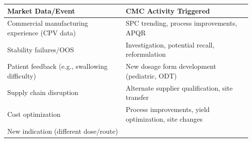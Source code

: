 \documentclass[
  11pt,
  a4paper,
]{report}
\begin{document}
\begin{longtable}[]{@{}ll@{}}
\toprule
\begin{minipage}[b]{0.44\columnwidth}\raggedright
Market Data/Event\strut
\end{minipage} & \begin{minipage}[b]{0.50\columnwidth}\raggedright
CMC Activity Triggered\strut
\end{minipage}\tabularnewline
\midrule
\endhead
\begin{minipage}[t]{0.44\columnwidth}\raggedright
Commercial manufacturing experience (CPV data)\strut
\end{minipage} & \begin{minipage}[t]{0.50\columnwidth}\raggedright
SPC trending, process improvements, APQR\strut
\end{minipage}\tabularnewline
\begin{minipage}[t]{0.44\columnwidth}\raggedright
Stability failures/OOS\strut
\end{minipage} & \begin{minipage}[t]{0.50\columnwidth}\raggedright
Investigation, potential recall, reformulation\strut
\end{minipage}\tabularnewline
\begin{minipage}[t]{0.44\columnwidth}\raggedright
Patient feedback (e.g., swallowing difficulty)\strut
\end{minipage} & \begin{minipage}[t]{0.50\columnwidth}\raggedright
New dosage form development (pediatric, ODT)\strut
\end{minipage}\tabularnewline
\begin{minipage}[t]{0.44\columnwidth}\raggedright
Supply chain disruption\strut
\end{minipage} & \begin{minipage}[t]{0.50\columnwidth}\raggedright
Alternate supplier qualification, site transfer\strut
\end{minipage}\tabularnewline
\begin{minipage}[t]{0.44\columnwidth}\raggedright
Cost optimization\strut
\end{minipage} & \begin{minipage}[t]{0.50\columnwidth}\raggedright
Process improvements, yield optimization, site changes\strut
\end{minipage}\tabularnewline
\begin{minipage}[t]{0.44\columnwidth}\raggedright
New indication (different dose/route)\strut
\end{minipage} & \begin{minipage}[t]{0.50\columnwidth}\raggedright

\end{minipage}
\end{longtable}
\end{document}
